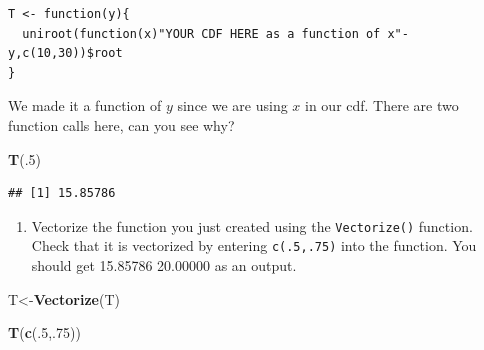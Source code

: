 \documentclass[
]{book}
\newenvironment{Shaded}{\begin{snugshade}}{\end{snugshade}}
\newcommand{\ControlFlowTok}[1]{\textcolor[rgb]{0.13,0.29,0.53}{\textbf{#1}}}
\newcommand{\DecValTok}[1]{\textcolor[rgb]{0.00,0.00,0.81}{#1}}
\newcommand{\KeywordTok}[1]{\textcolor[rgb]{0.13,0.29,0.53}{\textbf{#1}}}
\newcommand{\NormalTok}[1]{#1}
\newcommand{\OperatorTok}[1]{\textcolor[rgb]{0.81,0.36,0.00}{\textbf{#1}}}
\newcommand{\StringTok}[1]{\textcolor[rgb]{0.31,0.60,0.02}{#1}}
\providecommand{\tightlist}{%
  \setlength{\itemsep}{0pt}\setlength{\parskip}{0pt}}
\begin{document}
\begin{verbatim}
T <- function(y){
  uniroot(function(x)"YOUR CDF HERE as a function of x"-y,c(10,30))$root
}
\end{verbatim}

We made it a function of \(y\) since we are using \(x\) in our cdf. There are two function calls here, can you see why?

\begin{Shaded}
\end{Shaded}

\begin{Shaded}
\begin{Highlighting}[]
\KeywordTok{T}\NormalTok{(.}\DecValTok{5}\NormalTok{)}
\end{Highlighting}
\end{Shaded}

\begin{verbatim}
## [1] 15.85786
\end{verbatim}

\begin{enumerate}
\def\labelenumi{\alph{enumi}.}
\setcounter{enumi}{4}
\tightlist
\item
  Vectorize the function you just created using the \texttt{Vectorize()} function. Check that it is vectorized by entering \texttt{c(.5,.75)} into the function. You should get 15.85786 20.00000 as an output.
\end{enumerate}

\begin{Shaded}
\begin{Highlighting}[]
\NormalTok{T<-}\KeywordTok{Vectorize}\NormalTok{(T)}
\end{Highlighting}
\end{Shaded}

\begin{Shaded}
\begin{Highlighting}[]
\KeywordTok{T}\NormalTok{(}\KeywordTok{c}\NormalTok{(.}\DecValTok{5}\NormalTok{,.}\DecValTok{75}\NormalTok{))}
\end{Highlighting}
\end{Shaded}
\end{document}
